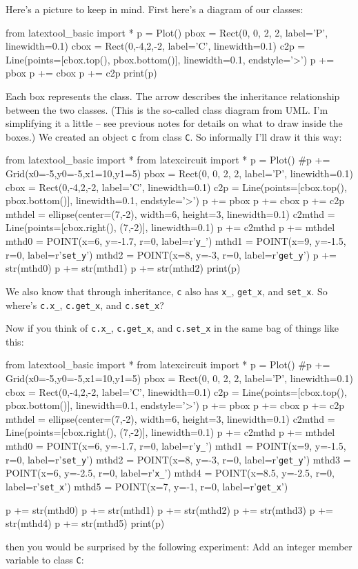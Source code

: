 Here's a picture to keep in mind. First here's a diagram of our classes:
\begin{python}
from latextool_basic import *
p = Plot()
pbox = Rect(0, 0, 2, 2, label='P', linewidth=0.1)
cbox = Rect(0,-4,2,-2, label='C', linewidth=0.1)
c2p = Line(points=[cbox.top(), pbox.bottom()], linewidth=0.1, endstyle='>')
p += pbox
p += cbox
p += c2p
print(p)
\end{python}
Each box represents the class. The arrow describes the inheritance
relationship between the two classes. (This is the so-called class
diagram from UML. I'm simplifying it a little -- see previous notes for
details on what to draw inside the boxes.) We created an object \verb!c!
from class \verb!C!. So informally I'll draw it this way:
\begin{python}
from latextool_basic import *
from latexcircuit import *
p = Plot()
#p += Grid(x0=-5,y0=-5,x1=10,y1=5)
pbox = Rect(0, 0, 2, 2, label='P', linewidth=0.1)
cbox = Rect(0,-4,2,-2, label='C', linewidth=0.1)
c2p = Line(points=[cbox.top(), pbox.bottom()], linewidth=0.1, endstyle='>')
p += pbox
p += cbox
p += c2p
mthdel = ellipse(center=(7,-2), width=6, height=3, linewidth=0.1)
c2mthd = Line(points=[cbox.right(), (7,-2)], linewidth=0.1)
p += c2mthd
p += mthdel
mthd0 = POINT(x=6, y=-1.7, r=0, label=r'\verb!y_!')
mthd1 = POINT(x=9, y=-1.5, r=0, label=r'\verb!set_y!')
mthd2 = POINT(x=8, y=-3, r=0, label=r'\verb!get_y!')
p += str(mthd0)
p += str(mthd1)
p += str(mthd2)
print(p)
\end{python}
We also know that through inheritance, \verb!c! also has \verb!x_!,
\verb!get_x!, and \verb!set_x!. So where's \verb!c.x_!,
\verb!c.get_x!, and \verb!c.set_x!?

Now if you think of \verb!c.x_!, \verb!c.get_x!, and \verb!c.set_x!
in the same bag of things like this:
\begin{python}
from latextool_basic import *
from latexcircuit import *
p = Plot()
#p += Grid(x0=-5,y0=-5,x1=10,y1=5)
pbox = Rect(0, 0, 2, 2, label='P', linewidth=0.1)
cbox = Rect(0,-4,2,-2, label='C', linewidth=0.1)
c2p = Line(points=[cbox.top(), pbox.bottom()], linewidth=0.1, endstyle='>')
p += pbox
p += cbox
p += c2p
mthdel = ellipse(center=(7,-2), width=6, height=3, linewidth=0.1)
c2mthd = Line(points=[cbox.right(), (7,-2)], linewidth=0.1)
p += c2mthd
p += mthdel
mthd0 = POINT(x=6, y=-1.7, r=0, label=r'\verb!y_!')
mthd1 = POINT(x=9, y=-1.5, r=0, label=r'\verb!set_y!')
mthd2 = POINT(x=8, y=-3, r=0, label=r'\verb!get_y!')
mthd3 = POINT(x=6, y=-2.5, r=0, label=r'\verb!x_!')
mthd4 = POINT(x=8.5, y=-2.5, r=0, label=r'\verb!set_x!')
mthd5 = POINT(x=7, y=-1, r=0, label=r'\verb!get_x!')

p += str(mthd0)
p += str(mthd1)
p += str(mthd2)
p += str(mthd3)
p += str(mthd4)
p += str(mthd5)
print(p)
\end{python}
then you would be surprised by the following experiment: Add an integer
member variable to class \verb!C!:

